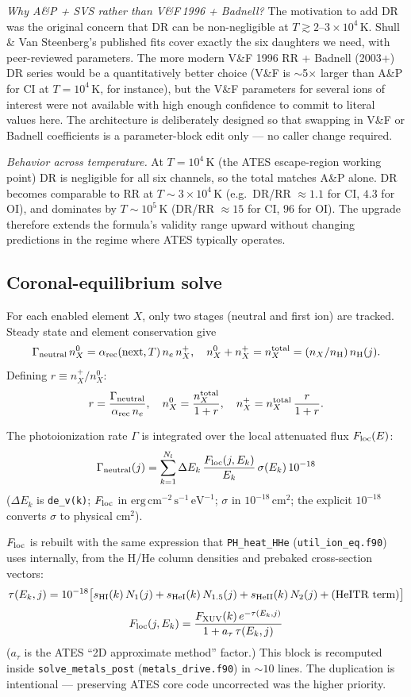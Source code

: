 \documentclass[english,a4paper]{my_memo}
\begin{document}
\textit{Why A\&P + SVS rather than V\&F\,1996 + Badnell?} The motivation
to add DR was the original concern that DR can be non-negligible at
$T \gtrsim 2$--$3 \times 10^4\,$K. Shull \& Van Steenberg's published
fits cover exactly the six daughters we need, with peer-reviewed
parameters. The more modern V\&F 1996 RR + Badnell (2003+) DR series
would be a quantitatively better choice (V\&F is $\sim$5$\times$ larger
than A\&P for CI at $T = 10^4\,$K, for instance), but the V\&F
parameters for several ions of interest were not available with high
enough confidence to commit to literal values here. The architecture is
deliberately designed so that swapping in V\&F or Badnell coefficients
is a parameter-block edit only --- no caller change required.

\textit{Behavior across temperature.} At $T = 10^4\,$K (the ATES
escape-region working point) DR is negligible for all six channels,
so the total matches A\&P alone. DR becomes comparable to RR at
$T \sim 3\times 10^4\,$K (e.g.\ DR/RR $\approx 1.1$ for CI,
$4.3$ for OI), and dominates by $T \sim 10^5\,$K (DR/RR $\approx 15$ for
CI, $96$ for OI). The upgrade therefore extends the formula's
validity range upward without changing predictions in the regime where
ATES typically operates.

\subsection{Coronal-equilibrium solve}

For each enabled element $X$, only two stages (neutral and first ion) are
tracked. Steady state and element conservation give
\[
\Gamma_{\rm neutral}\,n_X^0
   = \alpha_{\rm rec}({\rm next}, T)\,n_e\,n_X^+,
\quad
n_X^0 + n_X^+ = n_X^{\rm total}
   = (n_X / n_{\rm H})\,n_{\rm H}(j).
\]
Defining $r \equiv n_X^+ / n_X^0$:
\[
r = \frac{\Gamma_{\rm neutral}}{\alpha_{\rm rec}\,n_e},
\quad
n_X^0 = \frac{n_X^{\rm total}}{1 + r},
\quad
n_X^+ = n_X^{\rm total}\,\frac{r}{1 + r}.
\]

The photoionization rate $\Gamma$ is integrated over the local attenuated
flux $F_{\rm loc}(E)$:
\[
\Gamma_{\rm neutral}(j)
= \sum_{k=1}^{N_l} \Delta E_k\,
   \frac{F_{\rm loc}(j, E_k)}{E_k}\,\sigma(E_k)\,10^{-18}
\]
($\Delta E_k$ is \texttt{de\_v(k)}; $F_{\rm loc}$ in
$\mathrm{erg\,cm^{-2}\,s^{-1}\,eV^{-1}}$; $\sigma$ in $10^{-18}\,\mathrm{cm}^2$;
the explicit $10^{-18}$ converts $\sigma$ to physical cm$^2$).

$F_{\rm loc}$ is rebuilt with the same expression that
\texttt{PH\_heat\_HHe} (\texttt{util\_ion\_eq.f90}) uses internally, from
the H/He column densities and prebaked cross-section vectors:
\[
\tau(E_k, j) = 10^{-18}
\big[ s_{\rm HI}(k)\,N_1(j)
    + s_{\rm HeI}(k)\,N_{1.5}(j)
    + s_{\rm HeII}(k)\,N_2(j)
    + (\text{HeITR term})\big]
\]
\[
F_{\rm loc}(j, E_k)
 = \frac{F_{\rm XUV}(k)\,e^{-\tau(E_k, j)}}
        {1 + a_\tau\,\tau(E_k, j)}
\]
($a_\tau$ is the ATES ``2D approximate method'' factor.) This block is
recomputed inside \texttt{solve\_metals\_post}
(\texttt{metals\_drive.f90}) in $\sim 10$ lines. The duplication is
intentional --- preserving ATES core code uncorrected was the higher
priority.
\end{document}
